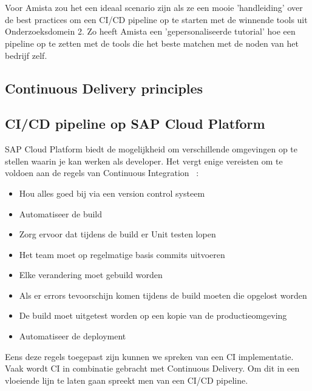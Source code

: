 
\chapter{}
\label{ch:handleiding}
Voor Amista zou het een ideaal scenario zijn als ze een mooie 'handleiding' over de best practices om een CI/CD pipeline op te starten met de winnende tools uit Onderzoeksdomein 2. Zo heeft Amista een 'gepersonaliseerde tutorial' hoe een pipeline op te zetten met de tools die het beste matchen met de noden van het bedrijf zelf.
\section{Continuous Delivery principles}
\label{sec:continuous-delivery-principles}

\section{CI/CD pipeline op SAP Cloud Platform}
\label{sec:ci-cd-op-sap-cloud-platform}
SAP Cloud Platform biedt de mogelijkheid om verschillende omgevingen op te stellen waarin je kan werken als developer. Het vergt enige vereisten om te voldoen aan de regels van Continuous Integration ~\autocite{Kramer2018}:
\begin{itemize}
    \item Hou alles goed bij via een version control systeem
    \item Automatiseer de build
    \item Zorg ervoor dat tijdens de build er Unit testen lopen
    \item Het team moet op regelmatige basis commits uitvoeren
    \item Elke verandering moet gebuild worden
    \item Als er errors tevoorschijn komen tijdens de build moeten die opgelost worden
    \item De build moet uitgetest worden op een kopie van de productieomgeving
    \item Automatiseer de deployment
\end{itemize}
Eens deze regels toegepast zijn kunnen we spreken van een CI implementatie.
Vaak wordt CI in combinatie gebracht met Continuous Delivery. Om dit in een vloeiende lijn te laten gaan spreekt men van een CI/CD pipeline.

